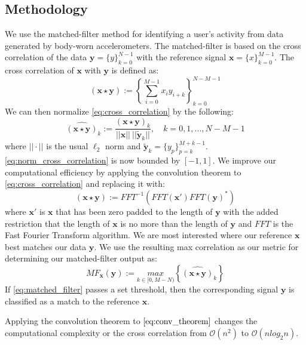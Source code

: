 \documentclass{sciposter}
\begin{document}
\begin{multicols}{3}
\section{Methodology}
We use the matched-filter method for identifying a user's activity from data generated by body-worn accelerometers.
The matched-filter is based on the cross correlation of the data $\textbf{y} = \{y\}_{k=0}^{N-1}$ with the reference signal $\textbf{x} = \{x\}_{k=0}^{M-1}$.
The cross correlation of $\textbf{x}$ with $\textbf{y}$ is defined as:
%
\begin{equation} \label{eq:cross_correlation}
(\textbf{x} \star \textbf{y}) := \left \{\sum_{i=0}^{M-1}x_{i} y_{i+k} \right \}_{k=0}^{N-M-1}
\end{equation}
%
We can then normalize \eqref{eq:cross_correlation} by the following:
%
\begin{equation} \label{eq:norm_cross_correlation}
\widehat{(\textbf{x} \star \textbf{y})}_k := \frac{(\textbf{x} \star \textbf{y})_k}{||\textbf{x}|| \ || \widetilde{\textbf{y}}_k || }, \quad k = 0,1,...,N-M-1
\end{equation}
%
where $|| \cdot ||$ is the usual $\ell_2$ norm and $\widetilde{\textbf{y}}_k = \{y_p\}_{p=k}^{M+k-1}$.
\eqref{eq:norm_cross_correlation} is now bounded by $[-1,1]$.
We improve our computational efficiency by applying the convolution theorem to \eqref{eq:cross_correlation} and replacing it with:
%
\begin{equation} \label{eq:conv_theorem}
(\textbf{x} \star \textbf{y}) := FFT^{-1}(FFT(\textbf{x}') FFT(\textbf{y})^*)
\end{equation}
%
where $\textbf{x}'$ is $\textbf{x}$ that has been zero padded to the length of $\textbf{y}$ with the added restriction that the length of $\textbf{x}$ is no more than the length of $\textbf{y}$ and $FFT$ is the Fast Fourier Transform algorithm.
We are most interested where our reference $\textbf{x}$ best matches our data $\textbf{y}$.
We use the resulting max correlation as our metric for determining our matched-filter output as:
%
\begin{equation} \label{eq:matched_filter}
MF_{\textbf{x}}(\textbf{y}) := \underset{k \in [0, M-N)}{max} \left \{\widehat{(\textbf{x} \star \textbf{y})}_k \right \}
\end{equation}
%
If \eqref{eq:matched_filter} passes a set threshold, then the corresponding signal $\textbf{y}$ is classified as a match to the reference $\textbf{x}$.

Applying the convolution theorem to $\eqref{eq:conv_theorem}$ changes the computational complexity or the cross correlation from $\mathcal{O}(n^2)$ to $\mathcal{O}(n log_2n)$.


\end{multicols}
\end{document}
